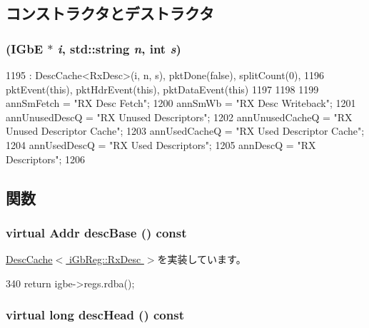 \subsection{コンストラクタとデストラクタ}
\hypertarget{classIGbE_1_1RxDescCache_aa0df94c8316951374e466ed453451b26}{
\subsubsection[{RxDescCache}]{ ({\bf IGbE} $\ast$ {\em i}, \/  std::string {\em n}, \/  int {\em s})}}
\label{classIGbE_1_1RxDescCache_aa0df94c8316951374e466ed453451b26}



\begin{DoxyCode}
1195     : DescCache<RxDesc>(i, n, s), pktDone(false), splitCount(0), 
1196       pktEvent(this), pktHdrEvent(this), pktDataEvent(this)
1197 
1198 {
1199     annSmFetch = "RX Desc Fetch";
1200     annSmWb = "RX Desc Writeback";
1201     annUnusedDescQ = "RX Unused Descriptors";
1202     annUnusedCacheQ = "RX Unused Descriptor Cache";
1203     annUsedCacheQ = "RX Used Descriptor Cache";
1204     annUsedDescQ = "RX Used Descriptors";
1205     annDescQ = "RX Descriptors";
1206 }
\end{DoxyCode}


\subsection{関数}
\hypertarget{classIGbE_1_1RxDescCache_ae5a77c90557026fdf4fd78883f92bef9}{
\subsubsection[{descBase}]{\setlength{\rightskip}{0pt plus 5cm}virtual {\bf Addr} descBase () const}}
\label{classIGbE_1_1RxDescCache_ae5a77c90557026fdf4fd78883f92bef9}


\hyperlink{classIGbE_1_1DescCache_aa8bdc83aee2be5e0eaa7a1f7f1f284e2}{DescCache$<$ iGbReg::RxDesc $>$}を実装しています。


\begin{DoxyCode}
340 { return igbe->regs.rdba(); }
\end{DoxyCode}
\hypertarget{classIGbE_1_1RxDescCache_af3d1877b6f30bdf98b95351c38d400f3}{
\subsubsection[{descHead}]{\setlength{\rightskip}{0pt plus 5cm}virtual long descHead () const}}
\label{classIGbE_1_1RxDescCache_af3d1877b6f30bdf98b95351c38d400f3}


